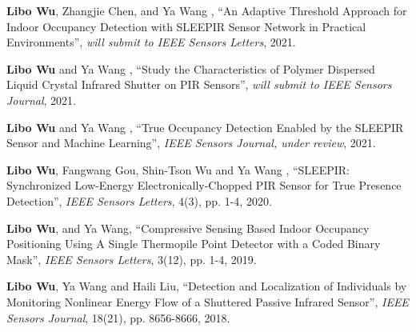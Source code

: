 

\begin{cvparagraph}

    \vspace{12pt}
    \begin{cvitems}
    \setlength{\itemsep}{2pt}
    \item{
        \textbf{Libo Wu}{, Zhangjie Chen, and Ya Wang , ``An Adaptive Threshold Approach for Indoor Occupancy Detection with SLEEPIR Sensor Network in Practical Environments'', \textit{will submit to IEEE Sensors Letters}, 2021.}}
     
    \item{
        \textbf{Libo Wu}{ and Ya Wang , ``Study the Characteristics of Polymer Dispersed Liquid Crystal Infrared Shutter on PIR Sensors'', \textit{will submit to IEEE Sensors Journal}, 2021.}}
      
    \item{
        \textbf{Libo Wu}{ and Ya Wang , ``True Occupancy Detection Enabled by the SLEEPIR Sensor and Machine Learning'', \textit{IEEE Sensors Journal, under review}, 2021.}}
      
    \item{
        \textbf{Libo Wu}{, Fangwang Gou, Shin-Tson Wu and Ya Wang , ``SLEEPIR: Synchronized Low-Energy Electronically-Chopped PIR Sensor for True Presence Detection'', \textit{IEEE Sensors Letters}, 4(3), pp. 1-4, 2020.}}
        
    \item{
        \textbf{Libo Wu}{, and Ya Wang, ``Compressive Sensing Based Indoor Occupancy Positioning Using A Single Thermopile Point Detector with a Coded Binary Mask'', \textit{IEEE Sensors Letters}, 3(12), pp. 1-4, 2019.}}
  
    \item{
        \textbf{Libo Wu}{, Ya Wang and Haili Liu, ``Detection and Localization of Individuals by Monitoring Nonlinear Energy Flow of a Shuttered Passive Infrared Sensor'', \textit{IEEE Sensors Journal}, 18(21), pp. 8656-8666, 2018.}}
  

\end{cvitems}
\end{cvparagraph}
